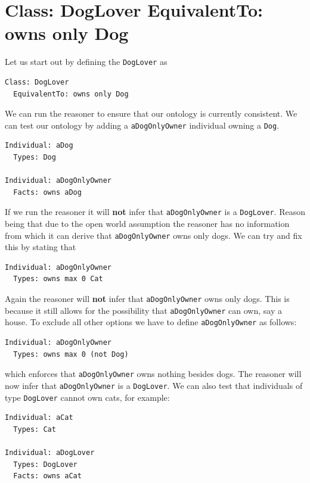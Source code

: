 \documentclass{amsart}
\begin{document}
  \section{Class: DogLover EquivalentTo: owns only Dog}
  Let us start out by defining the \texttt{DogLover} as 
\begin{small}
\begin{verbatim} 
Class: DogLover
  EquivalentTo: owns only Dog
\end{verbatim}
\end{small}    
We can run the reasoner to ensure that our ontology is currently consistent. We can test our ontology by adding a \texttt{aDogOnlyOwner} individual owning a \texttt{Dog}. 
\begin{small}
\begin{verbatim} 
Individual: aDog
  Types: Dog

Individual: aDogOnlyOwner
  Facts: owns aDog
\end{verbatim}
\end{small}
If we run the reasoner it will \textbf{not} infer that \texttt{aDogOnlyOwner} is a \texttt{DogLover}. Reason being that due to the open world assumption the reasoner has no information from which it can derive that \texttt{aDogOnlyOwner} owns only dogs. We can try and fix this by stating that
\begin{small}
\begin{verbatim} 
Individual: aDogOnlyOwner
  Types: owns max 0 Cat
\end{verbatim}
\end{small}
Again the reasoner will \textbf{not} infer that \texttt{aDogOnlyOwner} owns only dogs. This is because it still allows for the possibility that \texttt{aDogOnlyOwner} can own, say a house. To exclude all other options we have to define \texttt{aDogOnlyOwner} as follows:
\begin{small}
\begin{verbatim} 
Individual: aDogOnlyOwner
  Types: owns max 0 (not Dog)
\end{verbatim}
\end{small}
which enforces that \texttt{aDogOnlyOwner} owns nothing besides dogs. The reasoner will now infer that \texttt{aDogOnlyOwner} is a \texttt{DogLover}. We can also test that individuals of type \texttt{DogLover} cannot own cats, for example:
\begin{small}
\begin{verbatim} 
Individual: aCat
  Types: Cat
  
Individual: aDogLover
  Types: DogLover
  Facts: owns aCat
\end{verbatim}
\end{small}
\end{document}
